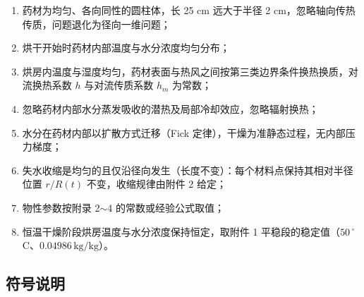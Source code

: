 \documentclass[withoutpreface,bwprint]{cumcmthesis} %
\begin{document}
\begin{enumerate}
\item 药材为均匀、各向同性的圆柱体，长 25 cm 远大于半径 2 cm，忽略轴向传热传质，问题退化为径向一维问题；
\item 烘干开始时药材内部温度与水分浓度均匀分布；
\item 烘房内温度与湿度均匀，药材表面与热风之间按第三类边界条件换热换质，对流换热系数 $h$ 与对流传质系数 $h_m$ 为常数；
\item 忽略药材内部水分蒸发吸收的潜热及局部冷却效应，忽略辐射换热；
\item 水分在药材内部以扩散方式迁移（Fick 定律），干燥为准静态过程，无内部压力梯度；
\item 失水收缩是均匀的且仅沿径向发生（长度不变）：每个材料点保持其相对半径位置 $r/R(t)$ 不变，收缩规律由附件 2 给定；
\item 物性参数按附录 2$\sim$4 的常数或经验公式取值；
\item 恒温干燥阶段烘房温度与水分浓度保持恒定，取附件 1 平稳段的稳定值（$50\,{}^\circ$C、$0.04986\,\mathrm{kg/kg}$）。
\end{enumerate}

\subsection{符号说明}
\end{document}
